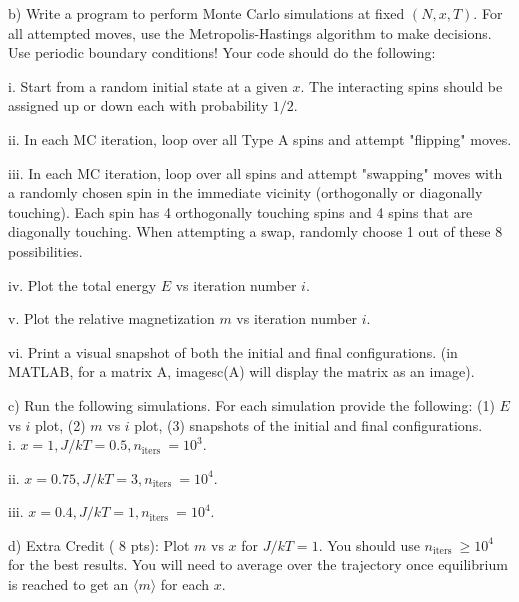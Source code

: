 \documentclass[12pt]{article}
\begin{document}
b) Write a program to perform Monte Carlo simulations at fixed $(N, x, T)$. For all attempted moves, use the Metropolis-Hastings algorithm to make decisions. Use periodic boundary conditions! Your code should do the following:

i. Start from a random initial state at a given $x$. The interacting spins should be assigned up or down each with probability $1 / 2$.

ii. In each MC iteration, loop over all Type A spins and attempt "flipping" moves.

iii. In each MC iteration, loop over all spins and attempt "swapping" moves with a randomly chosen spin in the immediate vicinity (orthogonally or diagonally touching). Each spin has 4 orthogonally touching spins and 4 spins that are diagonally touching. When attempting a swap, randomly choose 1 out of these 8 possibilities.

iv. Plot the total energy $E$ vs iteration number $i$.

v. Plot the relative magnetization $m$ vs iteration number $i$.

vi. Print a visual snapshot of both the initial and final configurations. (in MATLAB, for a matrix $\mathrm{A}$, imagesc(A) will display the matrix as an image).

c) Run the following simulations. For each simulation provide the following: (1) $E$ vs $i$ plot, (2) $m$ vs $i$ plot, (3) snapshots of the initial and final configurations.\\
i. $x=1, J / k T=0.5, n_{\text {iters }}=10^{3}$.

ii. $x=0.75, J / k T=3, n_{\text {iters }}=10^{4}$.

iii. $x=0.4, J / k T=1, n_{\text {iters }}=10^{4}$.

d) Extra Credit ( 8 pts): Plot $m$ vs $x$ for $J / k T=1$. You should use $n_{\text {iters }} \geq 10^{4}$ for the best results. You will need to average over the trajectory once equilibrium is reached to get an $\langle m\rangle$ for each $x$.
\end{document}
